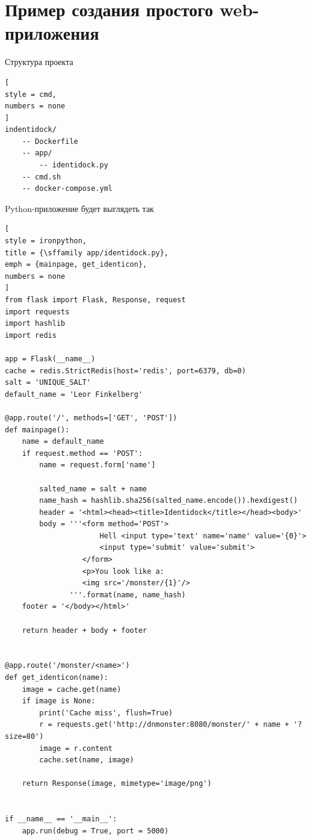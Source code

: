 \documentclass[%
	11pt,
	a4paper,
	utf8,
		]{article}
\begin{document}
\section{Пример создания простого web-приложения}

Структура проекта \cite[]{mouat:docker-2017}
\begin{lstlisting}[
style = cmd,
numbers = none
]
indentidock/
    -- Dockerfile
    -- app/
        -- identidock.py
    -- cmd.sh
    -- docker-compose.yml
\end{lstlisting}

Python-приложение будет выглядеть так
\begin{lstlisting}[
style = ironpython,
title = {\sffamily app/identidock.py},
emph = {mainpage, get_identicon},
numbers = none
]
from flask import Flask, Response, request
import requests
import hashlib
import redis

app = Flask(__name__)
cache = redis.StrictRedis(host='redis', port=6379, db=0)
salt = 'UNIQUE_SALT'
default_name = 'Leor Finkelberg'

@app.route('/', methods=['GET', 'POST'])
def mainpage():
    name = default_name
    if request.method == 'POST':
        name = request.form['name']

        salted_name = salt + name
        name_hash = hashlib.sha256(salted_name.encode()).hexdigest()
        header = '<html><head><title>Identidock</title></head><body>'
        body = '''<form method='POST'>
                      Hell <input type='text' name='name' value='{0}'>
                      <input type='submit' value='submit'>
                  </form>
                  <p>You look like a:
                  <img src='/monster/{1}'/>
               '''.format(name, name_hash)
    footer = '</body></html>'

    return header + body + footer


@app.route('/monster/<name>')
def get_identicon(name):
    image = cache.get(name)
    if image is None:
        print('Cache miss', flush=True)
        r = requests.get('http://dnmonster:8080/monster/' + name + '?size=80')
        image = r.content
        cache.set(name, image)

    return Response(image, mimetype='image/png')


if __name__ == '__main__':
    app.run(debug = True, port = 5000)
\end{lstlisting}
\end{document}
